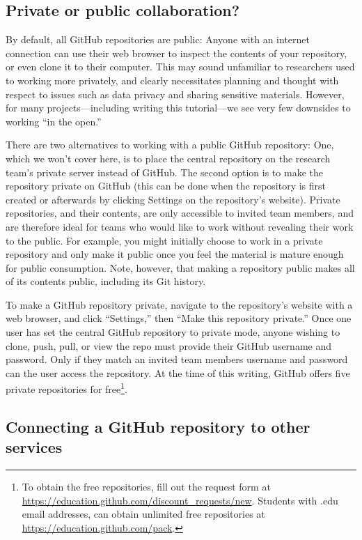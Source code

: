 \documentclass[
  american,
  ,doc,floatsintext]{apa6}
\begin{document}
\hypertarget{private-or-public-collaboration}{%
\subsection{Private or public collaboration?}\label{private-or-public-collaboration}}

By default, all GitHub repositories are public: Anyone with an internet connection can use their web browser to inspect the contents of your repository, or even clone it to their computer. This may sound unfamiliar to researchers used to working more privately, and clearly necessitates planning and thought with respect to issues such as data privacy and sharing sensitive materials. However, for many projects---including writing this tutorial---we see very few downsides to working ``in the open.''

There are two alternatives to working with a public GitHub repository: One, which we won't cover here, is to place the central repository on the research team's private server instead of GitHub. The second option is to make the repository private on GitHub (this can be done when the repository is first created or afterwards by clicking Settings on the repository's website). Private repositories, and their contents, are only accessible to invited team members, and are therefore ideal for teams who would like to work without revealing their work to the public. For example, you might initially choose to work in a private repository and only make it public once you feel the material is mature enough for public consumption. Note, however, that making a repository public makes all of its contents public, including its Git history.

To make a GitHub repository private, navigate to the repository's website with a web browser, and click ``Settings,'' then ``Make this repository private.'' Once one user has set the central GitHub repository to private mode, anyone wishing to clone, push, pull, or view the repo must provide their GitHub username and password. Only if they match an invited team members username and password can the user access the repository. At the time of this writing, GitHub offers five private repositories for free\footnote{To obtain the free repositories, fill out the request form at \url{https://education.github.com/discount_requests/new}. Students with .edu email addresses, can obtain unlimited free repositories at \url{https://education.github.com/pack}.}.

\hypertarget{connecting-a-github-repository-to-other-services}{%
\subsection{Connecting a GitHub repository to other services}\label{connecting-a-github-repository-to-other-services}}
\end{document}

